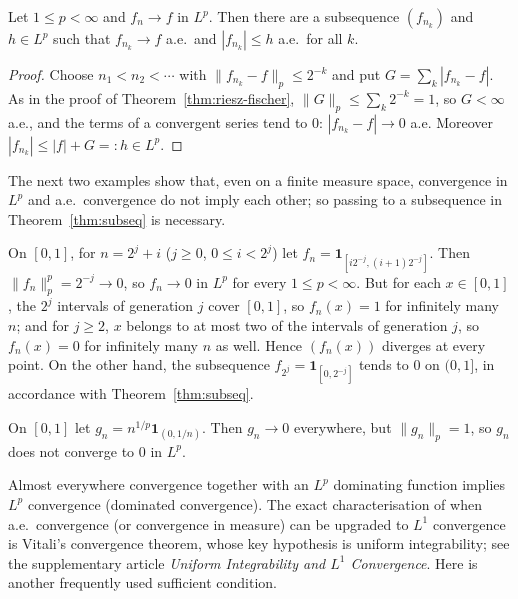 \documentclass[11pt]{article}
\newcommand{\norm}[1]{\lVert #1\rVert}
\newcommand{\ind}{\mathbf{1}}
\begin{document}
\begin{theorem}\label{thm:subseq}
Let $1\le p<\infty$ and $f_{n}\to f$ in $L^{p}$. Then there are a subsequence $(f_{n_{k}})$ and $h\in L^{p}$ such that $f_{n_{k}}\to f$ a.e.\ and $|f_{n_{k}}|\le h$ a.e.\ for all $k$.
\end{theorem}

\begin{proof}
Choose $n_{1}<n_{2}<\cdots$ with $\norm{f_{n_{k}}-f}_{p}\le2^{-k}$ and put $G=\sum_{k}|f_{n_{k}}-f|$. As in the proof of Theorem~\ref{thm:riesz-fischer}, $\norm{G}_{p}\le\sum_{k}2^{-k}=1$, so $G<\infty$ a.e., and the terms of a convergent series tend to $0$: $|f_{n_{k}}-f|\to0$ a.e. Moreover $|f_{n_{k}}|\le|f|+G=:h\in L^{p}$.
\end{proof}

The next two examples show that, even on a finite measure space, convergence in $L^{p}$ and a.e.\ convergence do not imply each other; so passing to a subsequence in Theorem~\ref{thm:subseq} is necessary.

\begin{example}\label{ex:typewriter}
On $[0,1]$, for $n=2^{j}+i$ ($j\ge0$, $0\le i<2^{j}$) let $f_{n}=\ind_{[i2^{-j},(i+1)2^{-j}]}$. Then $\norm{f_{n}}_{p}^{p}=2^{-j}\to0$, so $f_{n}\to0$ in $L^{p}$ for every $1\le p<\infty$. But for each $x\in[0,1]$, the $2^{j}$ intervals of generation $j$ cover $[0,1]$, so $f_{n}(x)=1$ for infinitely many $n$; and for $j\ge2$, $x$ belongs to at most two of the intervals of generation $j$, so $f_{n}(x)=0$ for infinitely many $n$ as well. Hence $(f_{n}(x))$ diverges at every point. On the other hand, the subsequence $f_{2^{j}}=\ind_{[0,2^{-j}]}$ tends to $0$ on $(0,1]$, in accordance with Theorem~\ref{thm:subseq}.
\end{example}

\begin{example}\label{ex:ae-not-Lp}
On $[0,1]$ let $g_{n}=n^{1/p}\ind_{(0,1/n)}$. Then $g_{n}\to0$ everywhere, but $\norm{g_{n}}_{p}=1$, so $g_{n}$ does not converge to $0$ in $L^{p}$.
\end{example}

Almost everywhere convergence together with an $L^{p}$ dominating function implies $L^{p}$ convergence (dominated convergence). The exact characterisation of when a.e.\ convergence (or convergence in measure) can be upgraded to $L^{1}$ convergence is Vitali's convergence theorem, whose key hypothesis is uniform integrability; see the supplementary article \emph{Uniform Integrability and $L^{1}$ Convergence}. Here is another frequently used sufficient condition.
\end{document}

